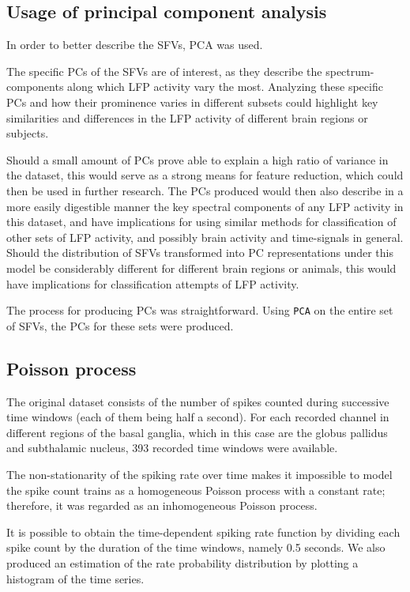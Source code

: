 \documentclass{article}
\begin{document}
\subsection{Usage of principal component analysis}\label{PCA Methods}

In order to better describe the SFVs, PCA was used.

The specific PCs of the SFVs are of interest, as they describe the spectrum-components along which LFP activity vary the most.
Analyzing these specific PCs and how their prominence varies in different subsets could highlight key similarities and differences in the LFP activity of different brain regions or subjects.

Should a small amount of PCs prove able to explain a high ratio of variance in the dataset, this would serve as a strong means for feature reduction, which could then be used in further research.
The PCs produced would then also describe in a more easily digestible manner the key spectral components of any LFP activity in this dataset, and have implications for using similar methods for classification of other sets of LFP activity, and possibly brain activity and time-signals in general.
Should the distribution of SFVs transformed into PC representations under this model be considerably different for different brain regions or animals, this would have implications for classification attempts of LFP activity.

The process for producing PCs was straightforward.
Using \texttt{PCA} on the entire set of SFVs, the PCs for these sets were produced.

\subsection{Poisson process}\label{Poiss Method}

The original dataset consists of the number of spikes counted during successive time windows (each of them being half a second). 
For each recorded channel in different regions of the basal ganglia, which in this case are the globus pallidus and subthalamic nucleus, 393 recorded time windows were available.

The non-stationarity of the spiking rate over time makes it impossible to model the spike count trains as a homogeneous Poisson process with a constant rate; therefore, it was regarded as an inhomogeneous Poisson process.

It is possible to obtain the time-dependent spiking rate function by dividing each spike count by the duration of the time windows, namely 0.5 seconds. 
We also produced an estimation of the rate probability distribution by plotting a histogram of the time series.
\end{document}
